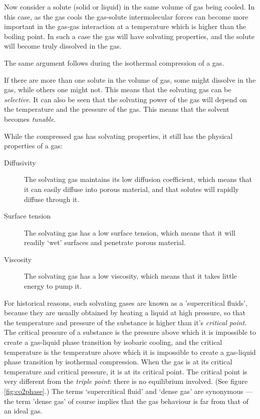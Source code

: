 Now consider a solute (solid or liquid) in the same volume of gas being cooled.
In this case, as the gas cools the gas-solute intermolecular forces can become
more important in the gas-gas interaction at a temperature which is higher than
the boiling point. In such a case the gas will have solvating properties, and
the solute will become truly dissolved in the gas.

The same argument follows during the isothermal compression of a gas. 

If there are more than one solute in the volume of gas, some might dissolve in
the gas, while others one might not. This means that the solvating gas can be
\textit{selective}. It can also be seen that the solvating power of the gas will
depend on the temperature and the pressure of the gas. This means that the
solvent becomes \textit{tunable}.

While the compressed gas has solvating properties, it still has the physical
properties of a gas:

\begin{description} 

\item[Diffusivity] The solvating gas maintains its low diffusion coefficient,
which means that it can easily diffuse into porous material, and that solutes
will rapidly diffuse through it. \done {}

\item[Surface tension] The solvating gas has a low surface tension, which means
that it will readily `wet' surfaces and penetrate porous material. \done {}

\item[Viscosity] The solvating gas has a low viscosity, which means that it
takes little energy to pump it. \done {}

\end{description} 

For historical reasons, such solvating gases are known as a 'supercritical
fluids', because they are usually obtained by heating a liquid at high pressure,
so that the temperature and pressure of the substance is higher than it's
\textit{critical point}. The critical pressure of a substance is the pressure
above which it is impossible to create a gas-liquid phase transition by isobaric
cooling, and the critical temperature is the temperature above which it is
impossible to create a gas-liquid phase transition by isothermal compression.
When the gas is at its critical temperature and critical pressure, it is at its
critical point. The critical point is very different from the \textit{triple
point}: there is no equilibrium involved. (See figure \ref{fig:co2phase}.) The
terms `supercritical fluid' and `dense gas' are synonymous --- the term 'dense
gas' of course implies that the gas behaviour is far from that of an ideal gas.

